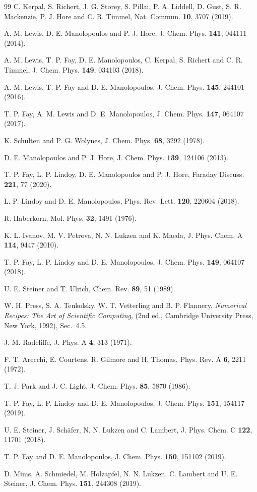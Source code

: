 \documentclass[%
aip,
jcp,%
amsmath,amssymb,
reprint%
]{revtex4-1}
\begin{document}
\begin{thebibliography}{99}
C. Kerpal, S. Richert, J. G. Storey, S. Pillai, P. A. Liddell, D. Gust, S. R. Mackenzie, P. J. Hore and C. R. Timmel, Nat. Commun. {\bf 10}, 3707 (2019).

A. M. Lewis, D. E. Manolopoulos and P. J. Hore, J. Chem. Phys. {\bf 141}, 044111 (2014).

A. M. Lewis, T. P. Fay, D. E. Manolopoulos, C. Kerpal, S. Richert and C. R. Timmel, J. Chem. Phys. {\bf 149}, 034103 (2018).

A. M. Lewis, T. P. Fay and D. E. Manolopoulos, J. Chem. Phys. {\bf 145}, 244101 (2016).

T. P. Fay, A. M. Lewis and D. E. Manolopoulos, J. Chem. Phys. {\bf 147}, 064107 (2017).

K. Schulten and P. G. Wolynes, J. Chem. Phys. {\bf 68}, 3292 (1978).

D. E. Manolopoulos and P. J. Hore, J. Chem. Phys. {\bf 139}, 124106 (2013).

T. P. Fay, L. P. Lindoy, D. E. Manolopoulos and P. J. Hore, Faraday Discuss. {\bf 221}, 77 (2020).

L. P. Lindoy and D. E. Manolopoulos, Phys. Rev. Lett. {\bf 120}, 220604 (2018).

R. Haberkorn, Mol. Phys. {\bf 32}, 1491 (1976).

K. L. Ivanov, M. V. Petrova, N. N. Lukzen and K. Maeda, J. Phys. Chem. A {\bf 114}, 9447 (2010).

T. P. Fay, L. P. Lindoy and D. E. Manolopoulos, J. Chem. Phys. {\bf 149}, 064107 (2018).

U. E. Steiner and T. Ulrich, Chem. Rev. {\bf 89}, 51 (1989).

W. H. Press, S. A. Teukolsky, W. T. Vetterling and B. P. Flannery, {\em Numerical Recipes: The Art of Scientific Computing}, (2nd ed., Cambridge University Press, New York, 1992), Sec.~4.5.

J. M. Radcliffe, J. Phys. A {\bf 4}, 313 (1971).

F. T. Arecchi, E. Courtens, R. Gilmore and H. Thomas, Phys. Rev. A {\bf 6}, 2211 (1972).

T. J. Park and J. C. Light, J. Chem. Phys. {\bf 85}, 5870 (1986).

T. P. Fay, L. P. Lindoy and D. E. Manolopoulos, J. Chem. Phys. {\bf 151}, 154117 (2019).

U. E. Steiner, J. Sch\"afer, N. N. Lukzen and C. Lambert, J. Phys. Chem. C {\bf 122}, 11701 (2018).

T. P. Fay and D. E. Manolopoulos, J. Chem. Phys. {\bf 150}, 151102 (2019).

D. Mims, A. Schmiedel, M. Holzapfel, N. N. Lukzen, C. Lambert and U. E. Steiner, J. Chem. Phys. {\bf 151}, 244308 (2019).


\end{thebibliography}
\end{document}
